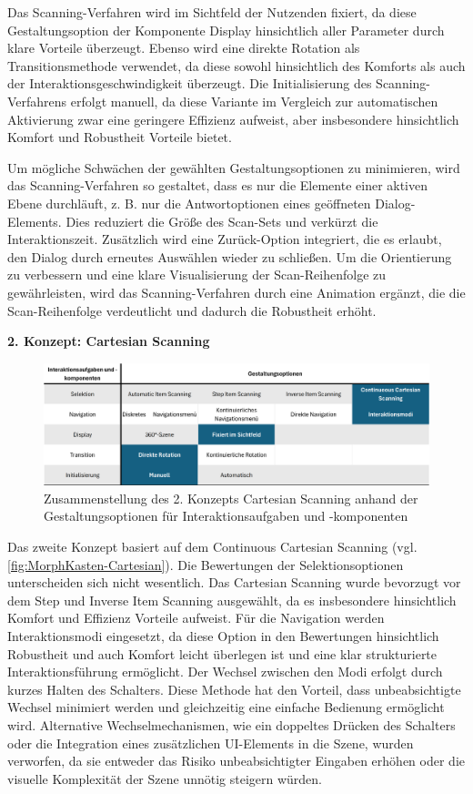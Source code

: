 Das Scanning-Verfahren wird im Sichtfeld der Nutzenden fixiert, da diese Gestaltungsoption der Komponente Display hinsichtlich aller Parameter durch klare Vorteile überzeugt. Ebenso wird eine direkte Rotation als Transitionsmethode verwendet, da diese sowohl hinsichtlich des Komforts als auch der Interaktionsgeschwindigkeit überzeugt. Die Initialisierung des Scanning-Verfahrens erfolgt manuell, da diese Variante im Vergleich zur automatischen Aktivierung zwar eine geringere Effizienz aufweist, aber insbesondere hinsichtlich Komfort und Robustheit Vorteile bietet.

Um mögliche Schwächen der gewählten Gestaltungsoptionen zu minimieren, wird das Scanning-Verfahren so gestaltet, dass es nur die Elemente einer aktiven Ebene durchläuft, z. B. nur die Antwortoptionen eines geöffneten Dialog-Elements. Dies reduziert die Größe des Scan-Sets und verkürzt die Interaktionszeit. Zusätzlich wird eine Zurück-Option integriert, die es erlaubt, den Dialog durch erneutes Auswählen wieder zu schließen. Um die Orientierung zu verbessern und eine klare Visualisierung der Scan-Reihenfolge zu gewährleisten, wird das Scanning-Verfahren durch eine Animation ergänzt, die die Scan-Reihenfolge verdeutlicht und dadurch die Robustheit erhöht.

{\normalfont \bfseries 2. Konzept: Cartesian Scanning}

\begin{figure}[tbh]
    \centering
    \includegraphics[width=1.0\textwidth]{images/MorphKasten-Cartesian.png}
    \caption{Zusammenstellung des 2. Konzepts Cartesian Scanning anhand der Gestaltungsoptionen für Interaktionsaufgaben und -komponenten}
    \label{fig:MorphKasten-Cartesian}
\end{figure}

Das zweite Konzept basiert auf dem Continuous Cartesian Scanning (vgl. \autoref{fig:MorphKasten-Cartesian}). Die Bewertungen der Selektionsoptionen unterscheiden sich nicht wesentlich. Das Cartesian Scanning wurde bevorzugt vor dem Step und Inverse Item Scanning ausgewählt, da es insbesondere hinsichtlich Komfort und Effizienz Vorteile aufweist. Für die Navigation werden Interaktionsmodi eingesetzt, da diese Option in den Bewertungen hinsichtlich Robustheit und auch Komfort leicht überlegen ist und eine klar strukturierte Interaktionsführung ermöglicht.
Der Wechsel zwischen den Modi erfolgt durch kurzes Halten des Schalters. Diese Methode hat den Vorteil, dass unbeabsichtigte Wechsel minimiert werden und gleichzeitig eine einfache Bedienung ermöglicht wird. Alternative Wechselmechanismen, wie ein doppeltes Drücken des Schalters oder die Integration eines zusätzlichen UI-Elements in die Szene, wurden verworfen, da sie entweder das Risiko unbeabsichtigter Eingaben erhöhen oder die visuelle Komplexität der Szene unnötig steigern würden.

